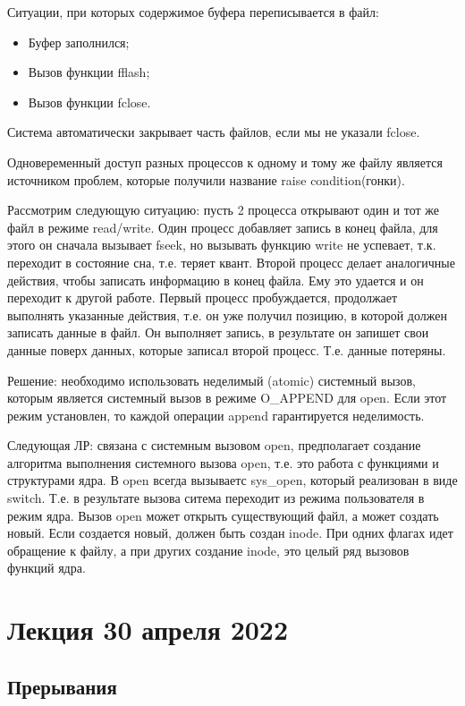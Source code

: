 \documentclass[12pt,a4paper]{scrreprt}
\begin{document}
Ситуации, при которых содержимое буфера переписывается в файл:

\begin{itemize}
	\item Буфер заполнился;
	\item Вызов функции fflash;
	\item Вызов функции fclose.
\end{itemize}

Система автоматически закрывает часть файлов, если мы не указали fclose.

Одновеременный доступ разных процессов к одному и тому же файлу является источником проблем, которые получили название raise condition(гонки). 

Рассмотрим следующую ситуацию: пусть 2 процесса открывают один и тот же файл в режиме read/write. Один процесс добавляет запись в конец файла, для этого он сначала вызывает fseek, но вызывать функцию write не успевает, т.к. переходит в состояние сна, т.е. теряет квант. Второй процесс делает аналогичные действия, чтобы записать информацию в конец файла. Ему это удается и он переходит к другой работе. Первый процесс пробуждается, продолжает выполнять указанные действия, т.е. он уже получил позицию, в которой должен записать данные в файл. Он выполняет запись, в результате он запишет свои данные поверх данных, которые записал второй процесс. Т.е. данные потеряны.

Решение: необходимо использовать неделимый (atomic) системный вызов, которым является системный вызов в режиме O\_APPEND для open. Если этот режим установлен, то каждой операции append гарантируется неделимость.

Следующая ЛР: связана с системным вызовом open, предполагает создание алгоритма выполнения системного вызова open, т.е. это работа с функциями и структурами ядра. В open всегда вызываетс sys\_open, который реализован в виде switch. Т.е. в результате вызова ситема переходит из режима пользователя в режим ядра. Вызов open может открыть существующий файл, а может создать новый. Если создается новый, должен быть создан inode. При одних флагах идет обращение к файлу, а при других создание inode, это целый ряд вызовов функций ядра.

\chapter{\textbf{Лекция 30 апреля 2022}}

\section{Прерывания}
\end{document}
